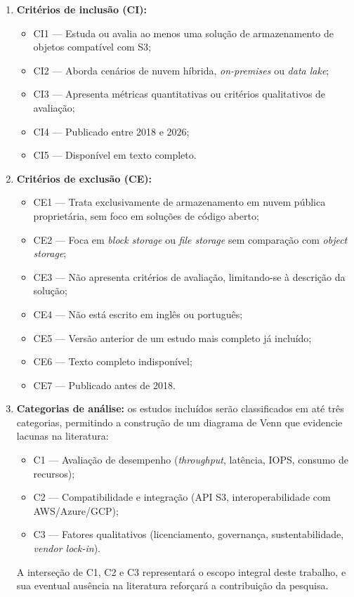 \documentclass[bacharelado]{pre-projeto-computacao}
\begin{document}
\begin{enumerate}
    \item \textbf{Critérios de inclusão (CI):}
    \begin{itemize}
        \item CI1 --- Estuda ou avalia ao menos uma solução de armazenamento de
              objetos compatível com S3;
        \item CI2 --- Aborda cenários de nuvem híbrida, \textit{on-premises} ou
              \textit{data lake};
        \item CI3 --- Apresenta métricas quantitativas ou critérios qualitativos
              de avaliação;
        \item CI4 --- Publicado entre 2018 e 2026;
        \item CI5 --- Disponível em texto completo.
    \end{itemize}

    \item \textbf{Critérios de exclusão (CE):}
    \begin{itemize}
        \item CE1 --- Trata exclusivamente de armazenamento em nuvem pública
              proprietária, sem foco em soluções de código aberto;
        \item CE2 --- Foca em \textit{block storage} ou \textit{file storage}
              sem comparação com \textit{object storage};
        \item CE3 --- Não apresenta critérios de avaliação, limitando-se à
              descrição da solução;
        \item CE4 --- Não está escrito em inglês ou português;
        \item CE5 --- Versão anterior de um estudo mais completo já incluído;
        \item CE6 --- Texto completo indisponível;
        \item CE7 --- Publicado antes de 2018.
    \end{itemize}

    \item \textbf{Categorias de análise:} os estudos incluídos serão
    classificados em até três categorias, permitindo a construção de um diagrama
    de Venn que evidencie lacunas na literatura:
    \begin{itemize}
        \item C1 --- Avaliação de desempenho (\textit{throughput}, latência,
              IOPS, consumo de recursos);
        \item C2 --- Compatibilidade e integração (API S3, interoperabilidade
              com AWS/Azure/GCP);
        \item C3 --- Fatores qualitativos (licenciamento, governança,
              sustentabilidade, \textit{vendor lock-in}).
    \end{itemize}
    A interseção de C1, C2 e C3 representará o escopo integral deste trabalho,
    e sua eventual ausência na literatura reforçará a contribuição da pesquisa.
\end{enumerate}
\end{document}
